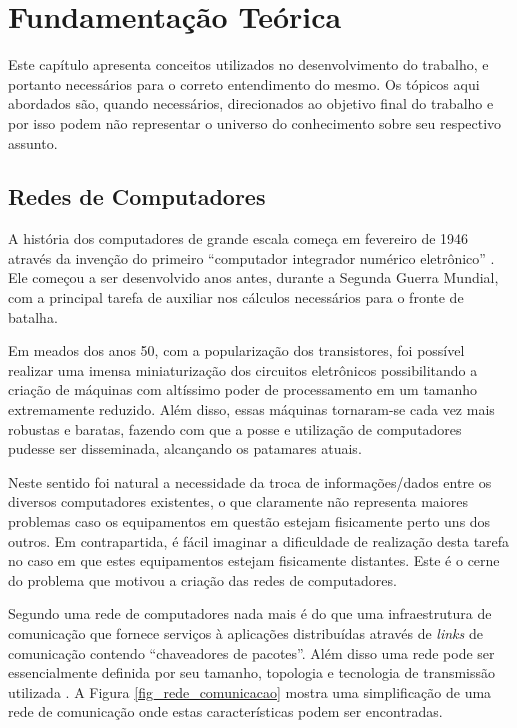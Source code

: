 \chapter{Fundamentação Teórica}
Este capítulo apresenta conceitos utilizados no desenvolvimento do trabalho, e portanto necessários para o correto entendimento do mesmo. Os tópicos aqui abordados são, quando necessários, direcionados ao objetivo final do trabalho e por isso podem não representar o universo do conhecimento sobre seu respectivo assunto.

\section{Redes de Computadores}
\label{redes-de-computadores}
A história dos computadores de grande escala começa em fevereiro de 1946 através da invenção do primeiro ``computador integrador numérico eletrônico''  \cite{Book-Jean2013}. Ele começou a ser desenvolvido anos antes, durante a Segunda Guerra Mundial, com a principal tarefa de auxiliar nos cálculos necessários para o fronte de batalha.

Em meados dos anos 50, com a popularização dos transistores, foi possível realizar uma imensa miniaturização dos circuitos eletrônicos possibilitando a criação de máquinas com altíssimo poder de processamento em um tamanho extremamente reduzido. Além disso, essas máquinas tornaram-se cada vez mais robustas e baratas, fazendo com que a posse e utilização de computadores pudesse ser disseminada, alcançando os patamares atuais.

Neste sentido foi natural a necessidade da troca de informações/dados entre os diversos computadores existentes, o que claramente não representa maiores problemas caso os equipamentos em questão estejam fisicamente perto uns dos outros. Em contrapartida, é fácil imaginar a dificuldade de realização desta tarefa no caso em que estes equipamentos estejam fisicamente distantes. Este é o cerne do problema que motivou a criação das redes de computadores.

Segundo \cite{Book-Kurose2013} uma rede de computadores nada mais é do que uma infraestrutura de comunicação que fornece serviços à aplicações distribuídas através de \emph{links} de comunicação contendo ``chaveadores de pacotes''. Além disso uma rede pode ser essencialmente definida por seu tamanho, topologia e tecnologia de transmissão utilizada \cite{Book-Tanenbaum2003}. A Figura \ref{fig_rede_comunicacao} mostra uma simplificação de uma rede de comunicação onde estas características podem ser encontradas.

